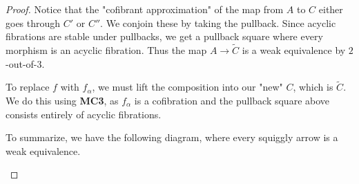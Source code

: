 \documentclass[../thesis.tex]{subfiles}
\begin{document}
\begin{proof}
                Notice that the "cofibrant approximation" of the map from $A$ to $C$ either goes through $C'$ or $C''$. We conjoin these by taking the pullback. Since acyclic fibrations are stable under pullbacks, we get a pullback square where every morphism is an acyclic fibration. Thus the map $A\rightarrow \widetilde{C}$ is a weak equivalence by $2$-out-of-$3$.
                \begin{center}
                \end{center}

                To replace $f$ with $f_\alpha$, we must lift the composition into our "new" $C$, which is $\widetilde{C}$. We do this using \textbf{MC3}, as $f_\alpha$ is a cofibration and the pullback square above consists entirely of acyclic fibrations.
                \begin{center}
                \end{center}

                To summarize, we have the following diagram, where every squiggly arrow is a weak equivalence.
                \begin{center}
                \end{center}


\end{proof}
\end{document}
